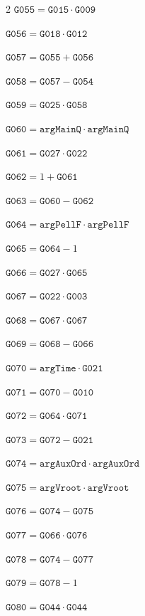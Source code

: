 \documentclass[10pt]{article}
\begin{document}
\begin{multicols}{2}
\noindent $\mathtt{G055}=\mathtt{G015}\cdot \mathtt{G009}$\par
\noindent $\mathtt{G056}=\mathtt{G018}\cdot \mathtt{G012}$\par
\noindent $\mathtt{G057}=\mathtt{G055}+\mathtt{G056}$\par
\noindent $\mathtt{G058}=\mathtt{G057}-\mathtt{G054}$\par
\noindent $\mathtt{G059}=\mathtt{G025}\cdot \mathtt{G058}$\par
\noindent $\mathtt{G060}=\mathtt{argMainQ}\cdot \mathtt{argMainQ}$\par
\noindent $\mathtt{G061}=\mathtt{G027}\cdot \mathtt{G022}$\par
\noindent $\mathtt{G062}=1+\mathtt{G061}$\par
\noindent $\mathtt{G063}=\mathtt{G060}-\mathtt{G062}$\par
\noindent $\mathtt{G064}=\mathtt{argPellF}\cdot \mathtt{argPellF}$\par
\noindent $\mathtt{G065}=\mathtt{G064}-1$\par
\noindent $\mathtt{G066}=\mathtt{G027}\cdot \mathtt{G065}$\par
\noindent $\mathtt{G067}=\mathtt{G022}\cdot \mathtt{G003}$\par
\noindent $\mathtt{G068}=\mathtt{G067}\cdot \mathtt{G067}$\par
\noindent $\mathtt{G069}=\mathtt{G068}-\mathtt{G066}$\par
\noindent $\mathtt{G070}=\mathtt{argTime}\cdot \mathtt{G021}$\par
\noindent $\mathtt{G071}=\mathtt{G070}-\mathtt{G010}$\par
\noindent $\mathtt{G072}=\mathtt{G064}\cdot \mathtt{G071}$\par
\noindent $\mathtt{G073}=\mathtt{G072}-\mathtt{G021}$\par
\noindent $\mathtt{G074}=\mathtt{argAuxOrd}\cdot \mathtt{argAuxOrd}$\par
\noindent $\mathtt{G075}=\mathtt{argVroot}\cdot \mathtt{argVroot}$\par
\noindent $\mathtt{G076}=\mathtt{G074}-\mathtt{G075}$\par
\noindent $\mathtt{G077}=\mathtt{G066}\cdot \mathtt{G076}$\par
\noindent $\mathtt{G078}=\mathtt{G074}-\mathtt{G077}$\par
\noindent $\mathtt{G079}=\mathtt{G078}-1$\par
\noindent $\mathtt{G080}=\mathtt{G044}\cdot \mathtt{G044}$\par

\end{multicols}
\end{document}
